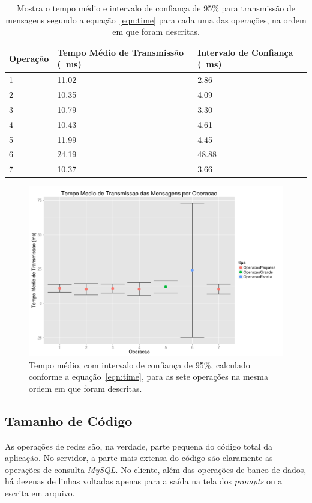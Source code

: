 \documentclass[12pt,a4paper]{article}
\begin{document}
\begin{table}[h]
\centering
\caption{Mostra o tempo médio e intervalo de confiança de 95\% para transmissão de mensagens segundo a equação~\ref{eqn:time} para cada uma das operações, na ordem em que foram descritas.}
\label{table:transmissao}
\begin{tabular}{lll}
Operação & Tempo Médio de Transmissão (\SI{}{\milli\second}) & Intervalo de Confiança (\SI{}{\milli\second}) \\ \hline
1        & 11.02                & 2.86   \\
2        & 10.35                & 4.09   \\
3        & 10.79                & 3.30   \\
4        & 10.43                & 4.61   \\
5        & 11.99                & 4.45   \\
6        & 24.19                & 48.88  \\
7        & 10.37                & 3.66  
\end{tabular}
\end{table}

\begin{figure}[h]
\centering
\includegraphics[width=\textwidth]{diagrama/resultadosTempoTransmissao.png}
\caption{Tempo médio, com intervalo de confiança de 95\%, calculado conforme a equação~\ref{eqn:time}, para as sete operações na mesma ordem em que foram descritas.}
\label{fig:transmissao}
\end{figure}

\subsection{Tamanho de Código}
As operações de redes são, na verdade, parte pequena do código total da aplicação. No servidor, a parte mais extensa do código são claramente as operações de consulta {\it MySQL}. No cliente, além das operações de banco de dados, há dezenas de linhas voltadas apenas para a saída na tela dos {\it prompts} ou a escrita em arquivo.
\end{document}
